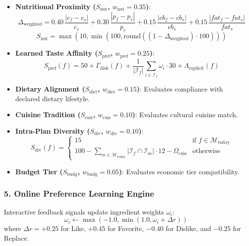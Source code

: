 \documentclass[12pt,a4paper]{report}
\begin{document}
\begin{itemize}
    \item \textbf{Nutritional Proximity ($S_{\text{nut}}$, $w_{\text{nut}} = 0.35$)}:
    \begin{equation}
    \Delta_{\text{weighted}} = 0.40\,\frac{|c_f - c_s|}{c_s} + 0.30\,\frac{|p_f - p_s|}{p_s} + 0.15\,\frac{|cb_f - cb_s|}{cb_s} + 0.15\,\frac{|fat_f - fat_s|}{fat_s}
    \end{equation}
    \begin{equation}
    S_{\text{nut}} = \max(10, \min(100, \text{round}((1 - \Delta_{\text{weighted}}) \cdot 100)))
    \end{equation}
    \item \textbf{Learned Taste Affinity ($S_{\text{pref}}$, $w_{\text{pref}} = 0.25$)}:
    \begin{equation}
    S_{\text{pref}}(f) = 50 + \Gamma_{\text{dish}}(f) + \frac{1}{|\mathcal{I}_f|} \sum_{i \in \mathcal{I}_f} \omega_i \cdot 30 + \Lambda_{\text{explicit}}(f)
    \end{equation}
    \item \textbf{Dietary Alignment ($S_{\text{diet}}$, $w_{\text{diet}} = 0.15$)}: Evaluates compliance with declared dietary lifestyle.
    \item \textbf{Cuisine Tradition ($S_{\text{cuis}}$, $w_{\text{cuis}} = 0.10$)}: Evaluates cultural cuisine match.
    \item \textbf{Intra-Plan Diversity ($S_{\text{div}}$, $w_{\text{div}} = 0.10$)}:
    \begin{equation}
    S_{\text{div}}(f) = \begin{cases}
    15 & \text{if } f \in \mathcal{M}_{\text{today}} \\
    100 - \sum_{m \in \mathcal{M}_{\text{today}}} |\mathcal{I}_f \cap \mathcal{I}_m| \cdot 12 - \Omega_{\text{cuis}} & \text{otherwise}
    \end{cases}
    \end{equation}
    \item \textbf{Budget Tier ($S_{\text{budg}}$, $w_{\text{budg}} = 0.05$)}: Evaluates economic tier compatibility.
\end{itemize}

\subsubsection{5. Online Preference Learning Engine}
Interactive feedback signals update ingredient weights $\omega_i$:
\begin{equation}
\omega_i \leftarrow \max\left(-1.0, \min\left(1.0, \omega_i + \Delta r\right)\right)
\end{equation}
where $\Delta r = +0.25$ for Like, $+0.45$ for Favorite, $-0.40$ for Dislike, and $-0.25$ for Replace.
\end{document}
